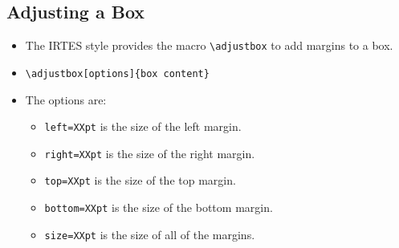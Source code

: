 \documentclass[english,circlenumberstyle]{irtesbeamer}
\begin{document}
\subsection{Adjusting a Box}
\begin{frame}{\subsecname}
	\begin{itemize}
	\item The IRTES style provides the macro \texttt{{\textbackslash}adjustbox} to add margins to a box.
	\item \texttt{{\textbackslash}adjustbox[options]\{box content\}}
	\item The options are:
		\begin{itemize}
		\item \texttt{left=XXpt} is the size of the left margin.
		\item \texttt{right=XXpt} is the size of the right margin.
		\item \texttt{top=XXpt} is the size of the top margin.
		\item \texttt{bottom=XXpt} is the size of the bottom margin.
		\item \texttt{size=XXpt} is the size of all of the margins.
		\end{itemize}
	\end{itemize}
\end{frame}
\end{document}
